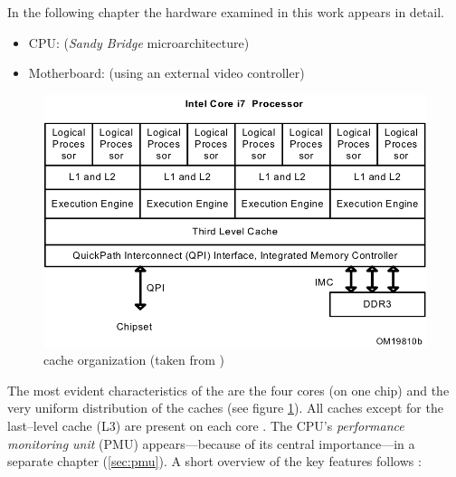 \label{sec:technical-prerequisites}

In the following chapter the hardware examined in this work appears in detail.


\label{sec:hw-products}

\begin{itemize}

\item CPU: \JWPLcpu{} (\emph{Sandy Bridge}\cite{wiki:snb} microarchitecture)

\item Motherboard: \JWPLboard{} (using an external video controller)

\end{itemize}


\label{sec:sandy-bridge}

\begin{figure}
  \centering
    \includegraphics[width=\textwidth]{fig/intel-cache-orga.png}
  \caption{\JWPcpu{} cache organization (taken from \cite{intel2011softdev1})}
  \label{fig:cache-orga}
\end{figure}

The most evident characteristics of the \JWPcpu{} are the four cores (on one
chip) and the very uniform distribution of the caches (see figure
\ref{fig:cache-orga}). All caches except for the last--level cache (L3) are
present on each core \cite{fog11}. The CPU's \emph{performance monitoring unit}
(PMU) appears---because of its central importance---in a separate chapter
(\ref{sec:pmu}). A short overview of the key features follows
\cite{intel2011spec}:

